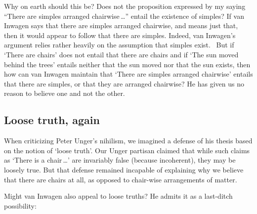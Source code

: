 \documentclass[11pt]{standalone}
\begin{document}
\begin{spacing}{1.5}
Why on earth should this be? Does not the proposition expressed by my
saying ``There are simples arranged chairwise\,\ldots '' entail the
existence of simples?  If van Inwagen says that there are simples
arranged chairwise, and means just that, then it would appear to
follow that there are simples.  Indeed, van Inwagen's argument relies
rather heavily on the assumption that simples exist.
%
%
\ But if `There are chairs' does not entail that there are chairs and
if `The sun moved behind the trees' entails neither that the sun moved
nor that the sun exists, then how can van Inwagen maintain that `There
are simples arranged chairwise' entails that there are simples, or
that they are arranged chairwise?  He has given us no reason to
believe one and not the other.

\subsection{Loose truth, again}
\label{loose-v}
When criticizing Peter Unger's nihilism, we imagined a defense of his
thesis based on the notion of `loose truth'.  Our Unger partisan
claimed that while such claims as `There is a chair\,\ldots ' are
invariably false (because incoherent), they may be loosely true.  But
that defense remained incapable of explaining why we believe that
there are chairs at all, as opposed to chair-wise arrangements of
matter.

Might van Inwagen also appeal to loose truths?  He admits it as a
last-ditch possibility:


\end{spacing}
\end{document}
